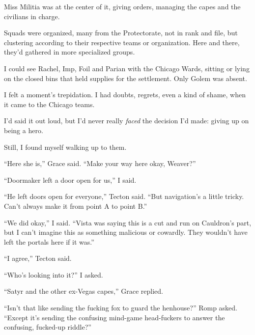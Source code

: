 Miss Militia was at the center of it, giving orders, managing the capes and the civilians in charge.



Squads were organized, many from the Protectorate, not in rank and file, but clustering according to their respective teams or organization.  Here and there, they'd gathered in more specialized groups.



I could see Rachel, Imp, Foil and Parian with the Chicago Wards, sitting or lying on the closed bins that held supplies for the settlement.  Only Golem was absent.



I felt a moment's trepidation.  I had doubts, regrets, even a kind of shame, when it came to the Chicago teams.



I'd said it out loud, but I'd never really \emph{faced} the decision I'd made: giving up on being a hero.



Still, I found myself walking up to them.



``Here she is,'' Grace said.  ``Make your way here okay, Weaver?''



``Doormaker left a door open for us,'' I said.



``He left doors open for everyone,'' Tecton said.  ``But navigation's a little tricky.  Can't always make it from point A to point B.''



``We did okay,'' I said.  ``Vista was saying this is a cut and run on Cauldron's part, but I can't imagine this as something malicious or cowardly.  They wouldn't have left the portals here if it was.''



``I agree,'' Tecton said.



``Who's looking into it?'' I asked.



``Satyr and the other ex-Vegas capes,'' Grace replied.



``Isn't that like sending the fucking fox to guard the henhouse?'' Romp asked.  ``Except it's sending the confusing mind-game head-fuckers to answer the confusing, fucked-up riddle?''



